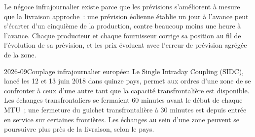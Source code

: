 Le négoce infrajournalier existe parce que les prévisions s'améliorent à mesure que la livraison approche~: une prévision éolienne établie
un jour à l'avance peut s'écarter d'un cinquième de la production, contre beaucoup moins une heure à l'avance. Chaque producteur et chaque fournisseur
corrige sa position au fil de l'évolution de sa prévision, et les prix évoluent avec l'erreur de prévision agrégée
de la zone.

\begin{dated}{2026-09}{Couplage infrajournalier européen}\label{dat:m3:power-markets-trading:sidc}
Le Single Intraday Coupling (SIDC), lancé les 12 et 13 juin 2018 dans quinze pays,
permet aux ordres d'une zone de se confronter à ceux d'une autre tant que la capacité transfrontalière est disponible. Les échanges
transfrontaliers se fermaient 60 minutes avant le début de chaque MTU~; une fermeture du guichet transfrontalière à 30 minutes
est depuis entrée en service sur certaines frontières. Les échanges au sein d'une zone peuvent se poursuivre plus près de la livraison,
selon le pays.
\end{dated}

\begin{omfigure}
\centering
{}

\label{fig:m3:power-markets-trading:timeline}
\end{omfigure}

